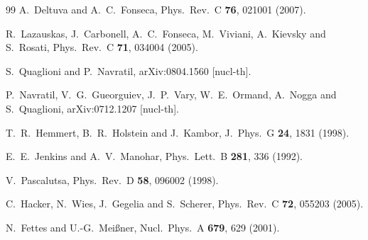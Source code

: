 \documentclass[aps,rmp,nofootinbib,twocolumn,floatfix]{revtex4}
\begin{document}
\begin{thebibliography}{99}
  A.~Deltuva and A.~C.~Fonseca,
  Phys.\ Rev.\  C {\bf 76}, 021001 (2007).

  R.~Lazauskas, J.~Carbonell, A.~C.~Fonseca, M.~Viviani, A.~Kievsky and S.~Rosati,
  Phys.\ Rev.\  C {\bf 71}, 034004 (2005).

  S.~Quaglioni and P.~Navratil,
  arXiv:0804.1560 [nucl-th].


  P.~Navratil, V.~G.~Gueorguiev, J.~P.~Vary, W.~E.~Ormand, A.~Nogga and S.~Quaglioni,
  arXiv:0712.1207 [nucl-th].

  T.~R.~Hemmert, B.~R.~Holstein and J.~Kambor,
  J.\ Phys.\ G {\bf 24}, 1831 (1998).

  E.~E.~Jenkins and A.~V.~Manohar,
  Phys.\ Lett.\  B {\bf 281}, 336 (1992).

  V.~Pascalutsa,
  Phys.\ Rev.\  D {\bf 58}, 096002 (1998).

  C.~Hacker, N.~Wies, J.~Gegelia and S.~Scherer,
  Phys.\ Rev.\  C {\bf 72}, 055203 (2005).


  N.~Fettes and U.-G.~Mei\ss ner,
  Nucl.\ Phys.\  A {\bf 679}, 629 (2001).



\end{thebibliography}
\end{document}
